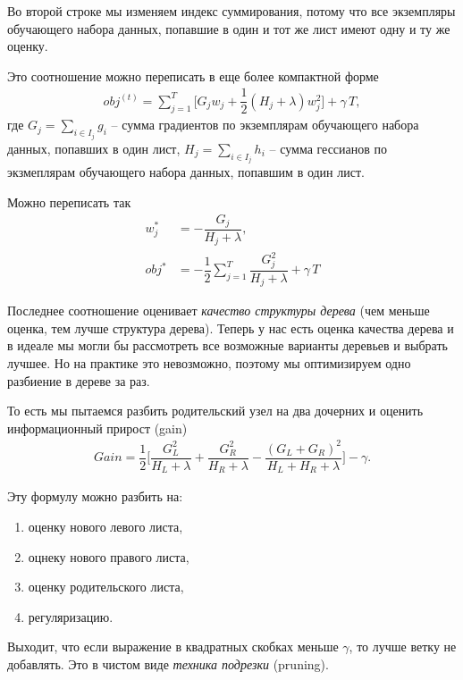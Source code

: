 \documentclass[%
	11pt,
	a4paper,
	utf8,
		]{article}
\begin{document}
Во второй строке мы изменяем индекс суммирования, потому что все экземпляры обучающего набора данных, попавшие в один и тот же лист имеют одну и ту же оценку.

Это соотношение можно переписать в еще более компактной форме
\begin{align*}
	obj^{(t)} = \sum_{j=1}^T \Big[ G_j w_j + \dfrac{1}{2} (H_j + \lambda)w_j^2 \Big] + \gamma \, T,
\end{align*}
где $ G_j = \sum_{i \in I_j} g_i $ -- сумма градиентов по экземплярам обучающего набора данных, попавших в один лист, $ H_j = \sum_{ i \in I_j } h_i $ -- сумма гессианов по экзмеплярам обучающего набора данных, попавшим в один лист.

Можно переписать так
\begin{align*}
	w_j^* &= - \dfrac{ G_j }{ H_j + \lambda }, \\
	obj^* &= - \dfrac{1}{2} \sum_{j=1}^T \dfrac{ G_j^2 }{ H_j + \lambda } + \gamma \, T
\end{align*}

Последнее соотношение оценивает \emph{качество структуры дерева} (чем меньше оценка, тем лучше структура дерева). Теперь у нас есть оценка качества дерева и в идеале мы могли бы рассмотреть все возможные варианты деревьев и выбрать лучшее. Но на практике это невозможно, поэтому мы оптимизируем одно разбиение в дереве за раз. 

То есть мы пытаемся разбить родительский узел на два дочерних и оценить информационный прирост (gain)
\begin{align*}
	Gain = \dfrac{1}{2} \Big[ \dfrac{G_L^2}{ H_L + \lambda } + \dfrac{G_R^2}{H_R + \lambda} - \dfrac{ (G_L + G_R)^2 }{ H_L +H_R +\lambda } \Big] - \gamma.
\end{align*}

Эту формулу можно разбить на:
\begin{enumerate}
	\item оценку нового левого листа,
	
	\item оцнеку нового правого листа,
	
	\item оценку родительского листа,
	
	\item регуляризацию.
\end{enumerate}

Выходит, что если выражение в квадратных скобках меньше $ \gamma $, то лучше ветку не добавлять. Это в чистом виде \emph{техника подрезки} (pruning).
\end{document}
